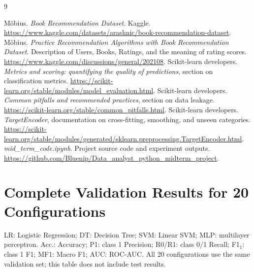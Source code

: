 \documentclass[12pt,a4paper]{article}
\begin{document}
\FloatBarrier
\Needspace{0.40\textheight}
\begingroup
\small
{}
\begin{thebibliography}{9}
Möbius. \emph{Book Recommendation Dataset}. Kaggle.
\url{https://www.kaggle.com/datasets/arashnic/book-recommendation-dataset}.
Möbius. \emph{Practice Recommendation Algorithms with Book Recommendation Dataset}.
Description of Users, Books, Ratings, and the meaning of rating scores.
\url{https://www.kaggle.com/discussions/general/202108}.
Scikit-learn developers. \emph{Metrics and scoring: quantifying the quality of predictions},
section on classification metrics.
\url{https://scikit-learn.org/stable/modules/model_evaluation.html}.
Scikit-learn developers. \emph{Common pitfalls and recommended practices}, section on data leakage.
\url{https://scikit-learn.org/stable/common_pitfalls.html}.
Scikit-learn developers. \emph{TargetEncoder}, documentation on cross-fitting, smoothing,
and unseen categories.
\url{https://scikit-learn.org/stable/modules/generated/sklearn.preprocessing.TargetEncoder.html}.
\emph{mid\_term\_code.ipynb}. Project source code and experiment outputs.
\url{https://github.com/Bluenip/Data_analyst_python_midterm_project}.
\end{thebibliography}
\endgroup

\clearpage
\appendix
{}
\section{Complete Validation Results for 20 Configurations}\label{app:full}
LR: Logistic Regression; DT: Decision Tree; SVM: Linear SVM; MLP: multilayer perceptron.
Acc.: Accuracy; P1: class 1 Precision; R0/R1: class 0/1 Recall; F1$_1$: class 1 F1;
MF1: Macro F1; AUC: ROC-AUC. All 20 configurations use the same validation set; this table does
not include test results.
\end{document}
